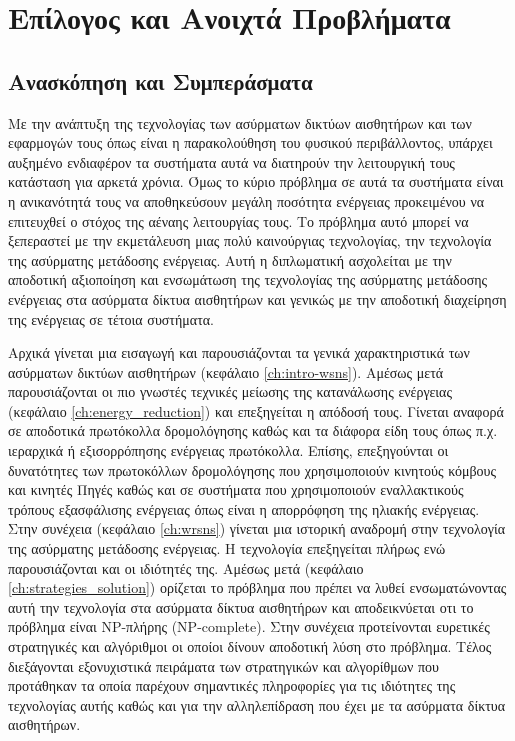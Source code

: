 

\chapter{Επίλογος και Ανοιχτά Προβλήματα}\label{ch:conclusion}
\section{Ανασκόπηση και Συμπεράσματα}
Με την ανάπτυξη της τεχνολογίας των ασύρματων δικτύων αισθητήρων και των εφαρμογών τους όπως είναι η παρακολούθηση του φυσικού περιβάλλοντος, υπάρχει αυξημένο
ενδιαφέρον τα συστήματα αυτά να διατηρούν την λειτουργική τους κατάσταση για αρκετά χρόνια. Όμως το κύριο πρόβλημα σε αυτά τα συστήματα είναι η ανικανότητά τους
να αποθηκεύσουν μεγάλη ποσότητα ενέργειας προκειμένου να επιτευχθεί ο στόχος της αέναης λειτουργίας τους. Το πρόβλημα αυτό μπορεί να ξεπεραστεί με την εκμετάλευση
μιας πολύ καινούργιας τεχνολογίας, την τεχνολογία της ασύρματης μετάδοσης ενέργειας. Αυτή η διπλωματική ασχολείται με την αποδοτική αξιοποίηση και ενσωμάτωση της
τεχνολογίας της ασύρματης μετάδοσης ενέργειας στα ασύρματα δίκτυα αισθητήρων και γενικώς με την αποδοτική διαχείρηση της ενέργειας σε τέτοια συστήματα.

Αρχικά γίνεται μια εισαγωγή και παρουσιάζονται τα γενικά χαρακτηριστικά των ασύρματων δικτύων αισθητήρων (κεφάλαιο \ref{ch:intro-wsns}). Αμέσως μετά παρουσιάζονται οι
πιο γνωστές τεχνικές μείωσης της κατανάλωσης ενέργειας (κεφάλαιο \ref{ch:energy_reduction}) και επεξηγείται η απόδοσή τους. Γίνεται αναφορά σε αποδοτικά
πρωτόκολλα δρομολόγησης καθώς και τα διάφορα είδη τους όπως π.χ. ιεραρχικά ή εξισορρόπησης ενέργειας πρωτόκολλα. Επίσης, επεξηγούνται οι δυνατότητες των πρωτοκόλλων
δρομολόγησης που χρησιμοποιούν κινητούς κόμβους και κινητές Πηγές καθώς και σε συστήματα που χρησιμοποιούν εναλλακτικούς τρόπους εξασφάλισης ενέργειας όπως είναι η
απορρόφηση της ηλιακής ενέργειας. Στην συνέχεια (κεφάλαιο \ref{ch:wrsns}) γίνεται μια ιστορική αναδρομή στην τεχνολογία της ασύρματης μετάδοσης ενέργειας. Η
τεχνολογία επεξηγείται πλήρως ενώ παρουσιάζονται και οι ιδιότητές της. Αμέσως μετά (κεφάλαιο \ref{ch:strategies_solution}) ορίζεται το πρόβλημα που πρέπει να λυθεί
ενσωματώνοντας αυτή την τεχνολογία στα ασύρματα δίκτυα αισθητήρων και αποδεικνύεται οτι το πρόβλημα είναι NP-πλήρης (NP-complete). Στην συνέχεια προτείνονται
ευρετικές στρατηγικές και αλγόριθμοι οι οποίοι δίνουν αποδοτική λύση στο πρόβλημα. Τέλος διεξάγονται εξονυχιστικά πειράματα των στρατηγικών και αλγορίθμων που
προτάθηκαν τα οποία παρέχουν σημαντικές πληροφορίες για τις ιδιότητες της τεχνολογίας αυτής καθώς και για την αλληλεπίδραση που έχει με τα ασύρματα δίκτυα αισθητήρων.

